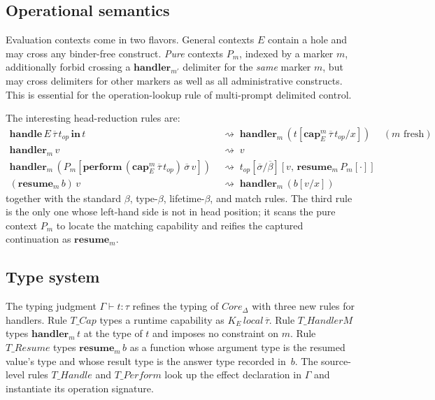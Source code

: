 \documentclass[12pt,a4paper]{article}
\newcommand{\keyword}[1]{\mathbf{#1}}
\begin{document}
    \subsection{Operational semantics}

    Evaluation contexts come in two flavors.
    General contexts $E$ contain a hole and may cross any binder-free construct.
    \emph{Pure} contexts $P_m$, indexed by a marker $m$, additionally forbid crossing
    a $\keyword{handler}_{m'}$ delimiter for the \emph{same} marker $m$, but may cross
    delimiters for other markers as well as all administrative constructs.
    This is essential for the operation-lookup rule of multi-prompt delimited control.

    The interesting head-reduction rules are:
    \begin{align*}
        \keyword{handle}\,E\,\overline{\tau}\,t_{op}\,\keyword{in}\,t
            &\;\rightsquigarrow\; \keyword{handler}_m\,(t[\keyword{cap}_E^m\,\overline{\tau}\,t_{op}/x])
                & (m \text{ fresh}) \\
        \keyword{handler}_m\,v &\;\rightsquigarrow\; v \\
        \keyword{handler}_m\,(P_m[\keyword{perform}\,(\keyword{cap}_E^m\,\overline{\tau}\,t_{op})\,\overline{\sigma}\,v])
            &\;\rightsquigarrow\; t_{op}[\overline{\sigma}/\overline{\beta}][v,\,\keyword{resume}_m\,P_m[\cdot]] \\
        (\keyword{resume}_m\,b)\,v &\;\rightsquigarrow\; \keyword{handler}_m\,(b[v/x])
    \end{align*}
    together with the standard $\beta$, type-$\beta$, lifetime-$\beta$, and match
    rules.
    The third rule is the only one whose left-hand side is not in head position;
    it scans the pure context $P_m$ to locate the matching capability and reifies the
    captured continuation as $\keyword{resume}_m$.

    \subsection{Type system}

    The typing judgment $\Gamma \vdash t : \tau$ refines the typing of $Core_\Delta$
    with three new rules for handlers.
    Rule $T\!\_Cap$ types a runtime capability as $K_E\,local\,\overline{\tau}$.
    Rule $T\!\_HandlerM$ types $\keyword{handler}_m\,t$ at the type of $t$ and imposes
    no constraint on $m$.
    Rule $T\!\_Resume$ types $\keyword{resume}_m\,b$ as a function whose argument type
    is the resumed value's type and whose result type is the answer type recorded
    in~$b$.
    The source-level rules $T\!\_Handle$ and $T\!\_Perform$ look up the effect
    declaration in $\Gamma$ and instantiate its operation signature.
\end{document}
